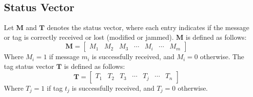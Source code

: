 

\subsection*{\textbf{Status Vector}} Let \( \mathbf{M} \) and \( \mathbf{T} \) denotes the status vector, where each entry indicates if the message or tag is correctly received or lost (modified or jammed). \( \mathbf{M} \) is defined as follows:
\[
\mathbf{M} = 
\begin{bmatrix}
M_1 & M_2 & M_3 & \cdots& M_i & \cdots & M_m 
\end{bmatrix}
\]
Where \( M_i = 1 \) if message \( m_i \) is successfully received, and \( M_i = 0 \) otherwise. The tag status vector \( \mathbf{T} \) is defined as follows:
\[
\mathbf{T} = 
\begin{bmatrix}
T_1 & T_2 & T_3 & \cdots & T_j & \cdots & T_n
\end{bmatrix}
\]
Where \( T_j = 1 \) if tag \( t_j \) is successfully received, and \( T_j = 0 \) otherwise. 








